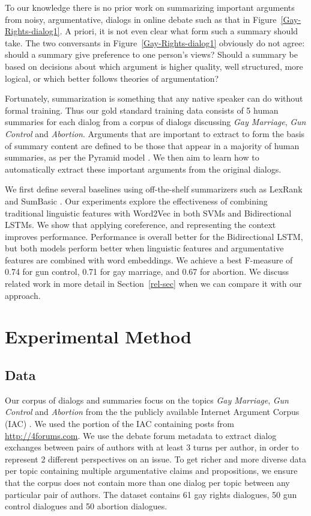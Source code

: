 \documentclass[11pt]{article}
\begin{document}
To our knowledge there is no prior work on summarizing important
arguments from noisy, argumentative, dialogs in online debate such
as that in Figure~\ref{Gay-Rights-dialog1}.  A priori, it is not
even clear what form such a summary should take.  The two conversants
in Figure~\ref{Gay-Rights-dialog1} obviously do not agree: should a
summary give preference to one person's views? Should a summary
be based on decisions about which argument is higher quality, well
structured, more logical, or which better follows theories of
argumentation?



Fortunately, summarization is something that any native speaker can do
without formal training. Thus our gold standard training data consists
of 5 human summaries for each dialog from a corpus of dialogs
discussing {\it Gay Marriage}, {\it Gun Control} and {\it Abortion}.
Arguments that are important to extract to form the basis of summary
content are defined to be those that appear in a majority of human
summaries, as per the Pyramid model \cite{pyramid04}.  We then
aim to learn how to automatically extract these important
arguments from the original dialogs.

We first define several baselines using off-the-shelf summarizers such
as LexRank and SumBasic
\cite{erkan2004lexrank,nenkova2005sumbasic}. Our experiments explore
the effectiveness of combining traditional linguistic features with
Word2Vec in both SVMs and Bidirectional LSTMs. We show that applying
coreference, and representing the context improves
performance. Performance is overall better for the Bidirectional LSTM,
but both models perform better when linguistic features and
argumentative features are combined with word embeddings. We achieve a
best F-measure of 0.74 for gun control, 0.71 for gay marriage, and
0.67 for abortion. We discuss related work in more detail in
Section~\ref{rel-sec} when we can compare it with our approach.

\section{Experimental Method}
\label{sec-ml-results}

\subsection{Data}
\label{corpus-sec}

Our corpus of dialogs and summaries focus on the topics {\it Gay
  Marriage}, {\it Gun Control} and {\it Abortion} from the the
publicly available Internet Argument Corpus (IAC)
\cite{Abbottetal16}. We used the portion of the IAC containing posts
from {\small \url{ http://4forums.com}}.  We use the debate forum
metadata to extract dialog exchanges between pairs of authors with at
least 3 turns per author, in order to represent 2 different
perspectives on an issue. To get richer and more diverse data per
topic containing multiple argumentative claims and propositions, we
ensure that the corpus does not contain more than one dialog per topic
between any particular pair of authors.  The dataset contains 61 gay
rights dialogues, 50 gun control dialogues and 50 abortion
dialogues. 
\end{document}
